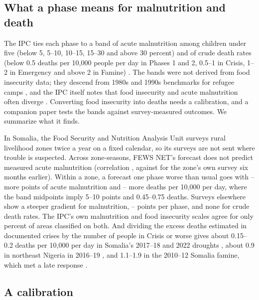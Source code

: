 \documentclass[11pt]{article}
\begin{document}
\begin{appendices}
\section{What a phase means for malnutrition and death}\label{app:phase}

The IPC ties each phase to a band of acute malnutrition among children under five (below 5, 5--10, 10--15, 15--30 and above 30 percent) and of crude death rates (below 0.5 deaths per 10,000 people per day in Phases 1 and 2, 0.5--1 in Crisis, 1--2 in Emergency and above 2 in Famine) \citep{IPC2021manual,ipcreftable}. The bands were not derived from food insecurity data; they descend from 1980s and 1990s benchmarks for refugee camps \citep{youngjaspars2009}, and the IPC itself notes that food insecurity and acute malnutrition often diverge \citep{ipc2016amn,ipc2024linkages}. Converting food insecurity into deaths needs a calibration, and a companion paper tests the bands against survey-measured outcomes. We summarize what it finds.

In Somalia, the Food Security and Nutrition Analysis Unit surveys rural livelihood zones twice a year on a fixed calendar, so its surveys are not sent where trouble is suspected. Across \fsN{} zone-seasons, FEWS NET's forecast does not predict measured acute malnutrition (correlation \fsCorrFc{}, against \fsCorrLag{} for the zone's own survey six months earlier). Within a zone, a forecast one phase worse than usual goes with \wzGamZoneSeason{}--\wzGamZone{} more points of acute malnutrition and \wzCdrZoneSeason{}--\wzCdrZone{} more deaths per 10,000 per day, where the band midpoints imply 5--10 points and 0.45--0.75 deaths. Surveys elsewhere show a steeper gradient for malnutrition, \spSlope{}--\fdwSlope{} points per phase, and none for crude death rates. The IPC's own malnutrition and food insecurity scales agree for only \amnAnyDiag{} percent of areas classified on both. And dividing the excess deaths estimated in documented crises by the number of people in Crisis or worse gives about 0.15--0.2 deaths per 10,000 per day in Somalia's 2017--18 and 2022 droughts \citep{warsame2023,lshtm2023somalia,ouchtar2026}, about 0.9 in northeast Nigeria in 2016--19 \citep{checchi2023nigeria}, and 1.1--1.9 in the 2010--12 Somalia famine, which met a late response \citep{checchi2013}.

\subsection{A calibration}


\end{appendices}
\end{document}
